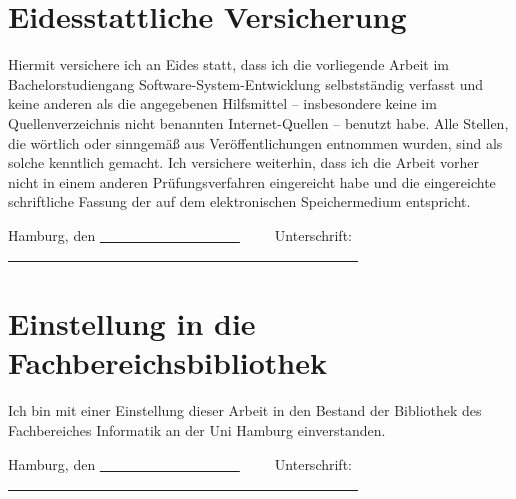 
\chapter*{Eidesstattliche Versicherung}
Hiermit versichere ich an Eides statt, dass ich die vorliegende Arbeit im
Bachelorstudiengang Software-System-Entwicklung selbstständig verfasst und
keine anderen als die angegebenen Hilfsmittel – insbesondere keine im
Quellenverzeichnis nicht benannten Internet-Quellen – benutzt habe. Alle Stellen,
die wörtlich oder sinngemäß aus Veröffentlichungen entnommen wurden, sind als
solche kenntlich gemacht. Ich versichere weiterhin, dass ich die Arbeit vorher nicht
in einem anderen Prüfungsverfahren eingereicht habe und die eingereichte
schriftliche Fassung der auf dem elektronischen Speichermedium entspricht.

\vspace{2cm}

\noindent Hamburg, den \uline{~~~~~~~~~~~~~~~~~~~~}~~~~~Unterschrift: \uline{~~~~~~~~~~~~~~~~~~~~~~~~~~~~~~~~~~~~~~~~~~~~~~~~~~}


\chapter*{Einstellung in die Fachbereichsbibliothek}
Ich bin mit einer Einstellung dieser Arbeit in den Bestand der Bibliothek des Fachbereiches Informatik an der Uni Hamburg einverstanden.

\vspace{2cm}

\noindent Hamburg, den \uline{~~~~~~~~~~~~~~~~~~~~}~~~~~Unterschrift: \uline{~~~~~~~~~~~~~~~~~~~~~~~~~~~~~~~~~~~~~~~~~~~~~~~~~~}

